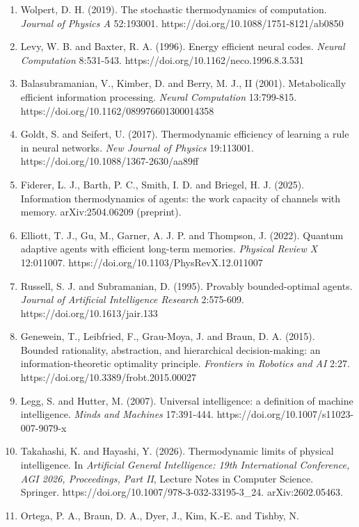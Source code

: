 \documentclass[
  10pt,
]{article}
\begin{document}
\begin{enumerate}
\item
  Wolpert, D. H. (2019). The stochastic thermodynamics of computation.
  \emph{Journal of Physics A} 52:193001.
  https://doi.org/10.1088/1751-8121/ab0850
\item
  Levy, W. B. and Baxter, R. A. (1996). Energy efficient neural codes.
  \emph{Neural Computation} 8:531-543.
  https://doi.org/10.1162/neco.1996.8.3.531
\item
  Balasubramanian, V., Kimber, D. and Berry, M. J., II (2001).
  Metabolically efficient information processing. \emph{Neural
  Computation} 13:799-815. https://doi.org/10.1162/089976601300014358
\item
  Goldt, S. and Seifert, U. (2017). Thermodynamic efficiency of learning
  a rule in neural networks. \emph{New Journal of Physics} 19:113001.
  https://doi.org/10.1088/1367-2630/aa89ff
\item
  Fiderer, L. J., Barth, P. C., Smith, I. D. and Briegel, H. J. (2025).
  Information thermodynamics of agents: the work capacity of channels
  with memory. arXiv:2504.06209 (preprint).
\item
  Elliott, T. J., Gu, M., Garner, A. J. P. and Thompson, J. (2022).
  Quantum adaptive agents with efficient long-term memories.
  \emph{Physical Review X} 12:011007.
  https://doi.org/10.1103/PhysRevX.12.011007
\item
  Russell, S. J. and Subramanian, D. (1995). Provably bounded-optimal
  agents. \emph{Journal of Artificial Intelligence Research} 2:575-609.
  https://doi.org/10.1613/jair.133
\item
  Genewein, T., Leibfried, F., Grau-Moya, J. and Braun, D. A. (2015).
  Bounded rationality, abstraction, and hierarchical decision-making: an
  information-theoretic optimality principle. \emph{Frontiers in
  Robotics and AI} 2:27. https://doi.org/10.3389/frobt.2015.00027
\item
  Legg, S. and Hutter, M. (2007). Universal intelligence: a definition
  of machine intelligence. \emph{Minds and Machines} 17:391-444.
  https://doi.org/10.1007/s11023-007-9079-x
\item
  Takahashi, K. and Hayashi, Y. (2026). Thermodynamic limits of physical
  intelligence. In \emph{Artificial General Intelligence: 19th
  International Conference, AGI 2026, Proceedings, Part II}, Lecture
  Notes in Computer Science. Springer.
  https://doi.org/10.1007/978-3-032-33195-3\_24. arXiv:2602.05463.
\item
  Ortega, P. A., Braun, D. A., Dyer, J., Kim, K.-E. and Tishby, N.

\end{enumerate}
\end{document}
